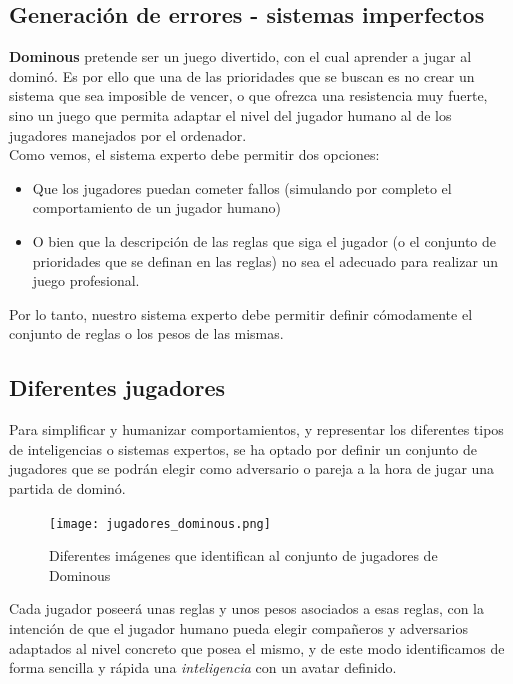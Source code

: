 \subsection{Generación de errores - sistemas imperfectos}

\textbf{Dominous} pretende ser un juego divertido, con el cual aprender a jugar al dominó. Es por ello que una de las
prioridades que se buscan es no crear un sistema que sea imposible de vencer, o que ofrezca una resistencia muy fuerte,
sino un juego que permita adaptar el nivel del jugador humano al de los jugadores manejados por el ordenador. \\

Como vemos, el sistema experto debe permitir dos opciones:
\begin{itemize}
    \item Que los jugadores puedan cometer fallos (simulando por completo el comportamiento de un jugador humano)
    \item O bien que la descripción de las reglas que siga el jugador (o el conjunto de prioridades que se definan
            en las reglas) no sea el adecuado para realizar un juego profesional.
\end{itemize}

Por lo tanto, nuestro sistema experto debe permitir definir cómodamente el conjunto de reglas o los pesos de las mismas.

\subsection{Diferentes jugadores}

Para simplificar y humanizar comportamientos, y representar los diferentes tipos de inteligencias o sistemas expertos,
se ha optado por definir un conjunto de jugadores que se podrán elegir como adversario o pareja a la hora de jugar
una partida de dominó.

\begin{figure}[h]
  \label{fig:jugadores_dominous}
  \begin{center}
    \texttt{[image: jugadores\_dominous.png]}
  \end{center}
  \caption{Diferentes imágenes que identifican al conjunto de jugadores de Dominous}
\end{figure}

Cada jugador poseerá unas reglas y unos pesos asociados a esas reglas, con la intención de que el jugador humano pueda
elegir compañeros y adversarios adaptados al nivel concreto que posea el mismo, y de este modo identificamos de forma
sencilla y rápida una \emph{inteligencia} con un avatar definido.

